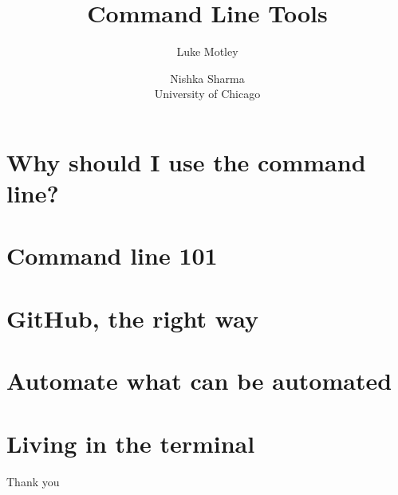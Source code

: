 \documentclass[12pt,notes=hide,aspectratio=169,mathserif,hyperref={colorlinks=true}]{beamer}
\title{Command Line Tools}
\author[Motley]{
Luke Motley \\ \and
Nishka Sharma
\\[1.0em]
{University of Chicago}
}
\date{{\color{blue}\monthname[\the\month] \the\year}}
\begin{document}
\begin{frame}[plain]
\setcounter{framenumber}{0}
\titlepage
\end{frame}
\section*{Why should I use the command line?}

\section{Command line 101}

\section{GitHub, the right way}

\section{Automate what can be automated}

\section{Living in the terminal}

%



\begin{frame}[plain] \begin{center}{\LARGE Thank you}\end{center} \end{frame}


\end{document}
